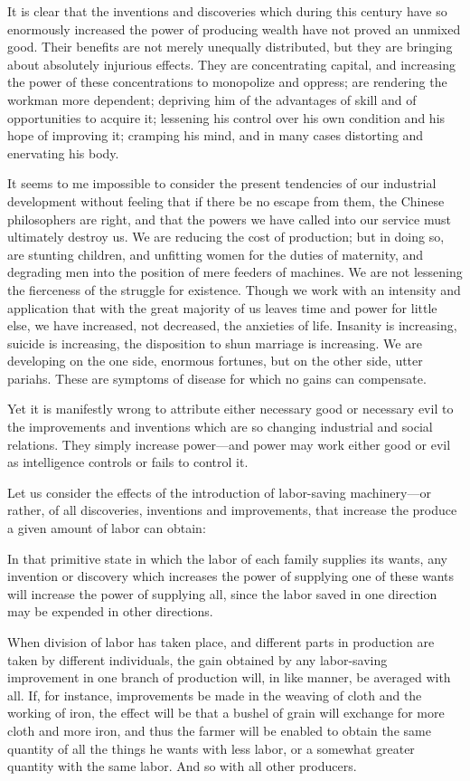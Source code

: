\documentclass{book}
\begin{document}
It is clear that the inventions and discoveries which during this century have so enormously increased the power of producing wealth have not proved an unmixed good. Their benefits are not merely unequally distributed, but they are bringing about absolutely injurious effects. They are concentrating capital, and increasing the power of these concentrations to monopolize and oppress; are rendering the workman more dependent; depriving him of the advantages of skill and of opportunities to acquire it; lessening his control over his own condition and his hope of improving it; cramping his mind, and in many cases distorting and enervating his body.

It seems to me impossible to consider the present tendencies of our industrial development without feeling that if there be no escape from them, the Chinese philosophers are right, and that the powers we have called into our service must ultimately destroy us. We are reducing the cost of production; but in doing so, are stunting children, and unfitting women for the duties of maternity, and degrading men into the position of mere feeders of machines. We are not lessening the fierceness of the struggle for existence. Though we work with an intensity and application that with the great majority of us leaves time and power for little else, we have increased, not decreased, the anxieties of life. Insanity is increasing, suicide is increasing, the disposition to shun marriage is increasing. We are developing on the one side, enormous fortunes, but on the other side, utter pariahs. These are symptoms of disease for which no gains can compensate.

Yet it is manifestly wrong to attribute either necessary good or necessary evil to the improvements and inventions which are so changing industrial and social relations. They simply increase power—and power may work either good or evil as intelligence controls or fails to control it.

Let us consider the effects of the introduction of labor-saving machinery—or rather, of all discoveries, inventions and improvements, that increase the produce a given amount of labor can obtain:

In that primitive state in which the labor of each family supplies its wants, any invention or discovery which increases the power of supplying one of these wants will increase the power of supplying all, since the labor saved in one direction may be expended in other directions.

When division of labor has taken place, and different parts in production are taken by different individuals, the gain obtained by any labor-saving improvement in one branch of production will, in like manner, be averaged with all. If, for instance, improvements be made in the weaving of cloth and the working of iron, the effect will be that a bushel of grain will exchange for more cloth and more iron, and thus the farmer will be enabled to obtain the same quantity of all the things he wants with less labor, or a somewhat greater quantity with the same labor. And so with all other producers.
\end{document}
